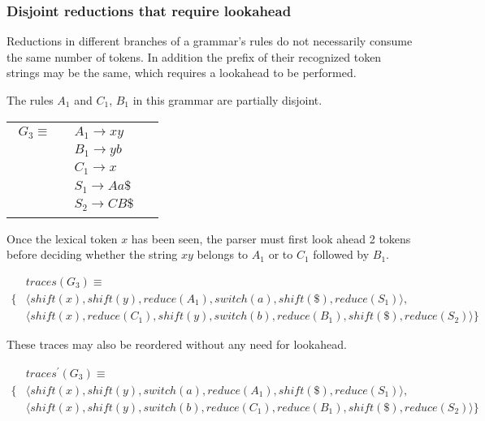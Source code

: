 \documentclass[a4paper,11pt]{article}
\begin{document}
\subsubsection{Disjoint reductions that require lookahead}
Reductions in different branches of a grammar's rules do not necessarily consume the same number of tokens. 
In addition the prefix of their recognized token strings may be the same, which requires a lookahead to be performed.

The rules $A_1$ and $C_1$, $B_1$ in this grammar are partially disjoint.

\begin{tabular}[t]{cl}
\parbox{.3\textwidth}{
\begin{align*}
G_3 \equiv \quad & A_1 \rightarrow x y\\
                 & B_1 \rightarrow y b\\
                 & C_1 \rightarrow x\\
                 & S_1 \rightarrow A a \$\\
                 & S_2 \rightarrow C B \$
\end{align*}}
\parbox{.6\textwidth}{}
\end{tabular}

Once the lexical token $x$ has been seen, the parser must first look ahead 2 tokens before 
deciding whether the string $x y$ belongs to $A_1$ or to $C_1$ followed by $B_1$.

{\small\parbox{.3\textwidth}{\begin{align*}
&traces(G_3) \equiv \\
\{ & \langle shift(x), shift(y), reduce(A_1), switch(a), shift(\$), reduce(S_1) \rangle,\\
   & \langle shift(x), reduce(C_1), shift(y), switch(b), reduce(B_1), shift(\$), reduce(S_2) \rangle \}
\end{align*}}}

These traces may also be reordered without any need for lookahead.

{\small\parbox{.3\textwidth}{\begin{align*}
&traces^{\prime}(G_3) \equiv \\
\{ & \langle shift(x), shift(y), switch(a), reduce(A_1), shift(\$), reduce(S_1) \rangle,\\
   & \langle shift(x), shift(y), switch(b), reduce(C_1), reduce(B_1), shift(\$), reduce(S_2) \rangle \}
\end{align*}}}

\end{document}

